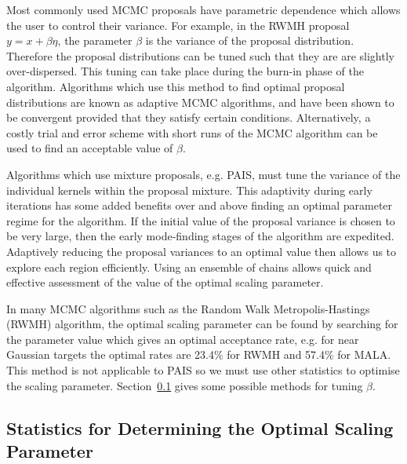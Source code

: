 \documentclass[final]{siamltex}
\begin{document}
Most commonly used MCMC proposals have parametric dependence which
allows the user to control their variance. For example, in the RWMH
proposal $y = x + \beta \eta$, the parameter $\beta$ is the variance
of the proposal distribution. Therefore the proposal distributions can
be tuned such that they are are slightly over-dispersed. This tuning
can take place during the burn-in phase of the algorithm. Algorithms
which use this method to find optimal proposal distributions are known
as adaptive MCMC algorithms, and have been shown to be convergent
provided that they satisfy certain
conditions\cite{roberts2007coupling,roberts2009examples}.
Alternatively, a costly trial and error scheme with short runs of the
MCMC algorithm can be used to find an acceptable value of $\beta$.

Algorithms which use mixture proposals, e.g. PAIS, must tune the
variance of the individual kernels within the proposal mixture. This
adaptivity during early iterations has some added benefits over and above
finding an optimal parameter regime for the algorithm. If the initial
value of the proposal variance is chosen to be very large, then the early
mode-finding stages of the algorithm are expedited. Adaptively
reducing the proposal variances to an optimal value then allows us to
explore each region efficiently. Using an ensemble of chains allows
quick and effective assessment of the value of the optimal scaling
parameter.


In many MCMC algorithms such as the Random Walk Metropolis-Hastings
(RWMH) algorithm, the optimal scaling parameter can be found by
searching for the parameter value which gives an optimal acceptance
rate, e.g. for near Gaussian targets the optimal rates are 23.4\% for
RWMH and 57.4\% for MALA\cite{roberts2001optimal}. This method
is not applicable to PAIS so we must use other statistics to optimise
the scaling parameter. Section~\ref{sec:statistics} gives some
possible methods for tuning $\beta$.

\subsection{Statistics for Determining the Optimal Scaling Parameter}\label{sec:statistics}
\end{document}

